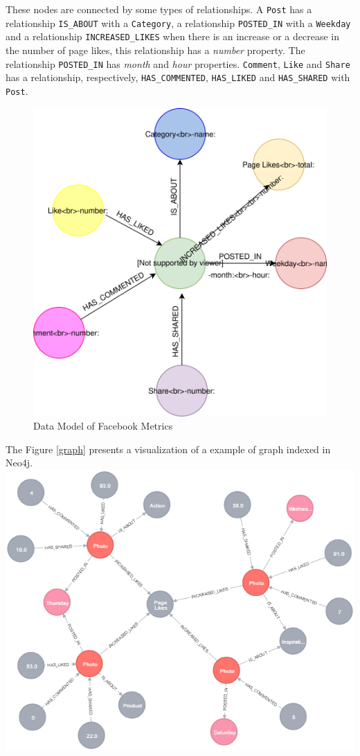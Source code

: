 These nodes are connected by some types of relationships. A
\texttt{Post} has a relationship \texttt{IS\_ABOUT} with a
\texttt{Category}, a relationship \texttt{POSTED\_IN} with a
\texttt{Weekday} and a relationship \texttt{INCREASED\_LIKES} when there
is an increase or a decrease in the number of page likes, this
relationship has a \emph{number} property. The relationship
\texttt{POSTED\_IN} has \emph{month} and \emph{hour} properties.
\texttt{Comment}, \texttt{Like} and \texttt{Share} has a relationship,
respectively, \texttt{HAS\_COMMENTED}, \texttt{HAS\_LIKED} and
\texttt{HAS\_SHARED} with \texttt{Post}.

\begin{figure}
\centering
\includegraphics{../figures/data-model.svg}
\caption{Data Model of Facebook Metrics}
\end{figure}

The Figure \ref{graph} presents a visualization of a example of graph
indexed in Neo4j. \includegraphics{../figures/graph-example.png}

